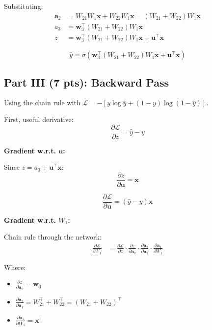 \documentclass[11pt]{article}
\begin{document}
Substituting:
\begin{align*}
\mathbf{a}_2 &= W_{21} W_1 \mathbf{x} + W_{22} W_1 \mathbf{x} = (W_{21} + W_{22}) W_1 \mathbf{x} \\
a_3 &= \mathbf{w}_3^\top (W_{21} + W_{22}) W_1 \mathbf{x} \\
z &= \mathbf{w}_3^\top (W_{21} + W_{22}) W_1 \mathbf{x} + \mathbf{u}^\top \mathbf{x}
\end{align*}

\[
\boxed{\hat{y} = \sigma\left(\mathbf{w}_3^\top (W_{21} + W_{22}) W_1 \mathbf{x} + \mathbf{u}^\top \mathbf{x}\right)}
\]

\subsection*{Part III (7 pts): Backward Pass}

Using the chain rule with $\mathcal{L} = -[y \log \hat{y} + (1-y)\log(1-\hat{y})]$.

First, useful derivative:
\[
\frac{\partial \mathcal{L}}{\partial z} = \hat{y} - y
\]

\textbf{Gradient w.r.t. $\mathbf{u}$:}

Since $z = a_3 + \mathbf{u}^\top \mathbf{x}$:
\[
\frac{\partial z}{\partial \mathbf{u}} = \mathbf{x}
\]

\[
\boxed{\frac{\partial \mathcal{L}}{\partial \mathbf{u}} = (\hat{y} - y) \mathbf{x}}
\]

\textbf{Gradient w.r.t. $W_1$:}

Chain rule through the network:
\begin{align*}
\frac{\partial \mathcal{L}}{\partial W_1} &= \frac{\partial \mathcal{L}}{\partial z} \cdot \frac{\partial z}{\partial \mathbf{a}_2} \cdot \frac{\partial \mathbf{a}_2}{\partial \mathbf{a}_1} \cdot \frac{\partial \mathbf{a}_1}{\partial W_1}
\end{align*}

Where:
\begin{itemize}[nosep]
    \item $\frac{\partial z}{\partial \mathbf{a}_2} = \mathbf{w}_3$
    \item $\frac{\partial \mathbf{a}_2}{\partial \mathbf{a}_1} = W_{21}^\top + W_{22}^\top = (W_{21} + W_{22})^\top$
    \item $\frac{\partial \mathbf{a}_1}{\partial W_1} = \mathbf{x}^\top$
\end{itemize}
\end{document}
